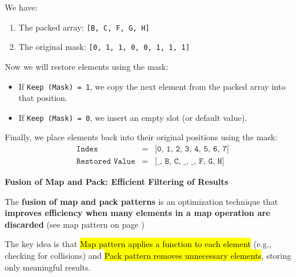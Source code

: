 \begin{examplebox}
    We have:
    \begin{enumerate}
        \item The packed array: \texttt{[B, C, F, G, H]}
        \item The original mask: \texttt{[0, 1, 1, 0, 0, 1, 1, 1]}
    \end{enumerate}
    Now we will restore elements using the mask:
    \begin{itemize}
        \item If \texttt{Keep (Mask) = 1}, we copy the next element from the packed array into that position.
        \item If \texttt{Keep (Mask) = 0}, we insert an empty slot (or default value).
    \end{itemize}
    Finally, we place elements back into their original positions using the mask:
    \begin{equation*}
        \begin{array}{rcl}
            \texttt{Index}          & = & \texttt{[0, 1, 2, 3, 4, 5, 6, 7]} \\ [.5em]
            \texttt{Restored Value} & = & \texttt{[\_, B, C, \_, \_, F, G, H]}
        \end{array}
    \end{equation*}
\end{examplebox}

\newpage

\begin{flushleft}
    \textcolor{Green3}{\faIcon{\speedIcon} \textbf{Fusion of Map and Pack: Efficient Filtering of Results}}
\end{flushleft}
The \textbf{fusion of map and pack patterns} is an optimization technique that \textbf{improves efficiency when many elements in a map operation are discarded} (see map pattern on page \pageref{subsection: Map Pattern})

\highspace
The key idea is that \hl{Map pattern applies a function to each element} (e.g., checking for collisions) and \hl{Pack pattern removes unnecessary elements}, storing only meaningful results.

